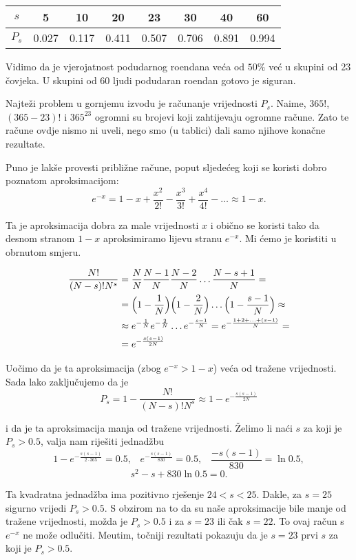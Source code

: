 \documentclass{ppclanak}
\begin{document}
\begin{enumerate}
\begin{center}
\begin{tabular}{|c|c|c|c|c|c|c|c|}
\hline $s$ & 5& 10 & 20 & 23 & 30 & 40 & 60\\
\hline $P_s$ & 0.027 & 0.117 & 0.411 & 0.507 & 0.706 & 0.891 &
0.994\\
\hline
\end{tabular}
\end{center}

Vidimo da je vjerojatnost podudarnog ro\dj endana ve\'{c}a od
$50\%$ ve\'{c} u skupini od 23 \v{c}ovjeka. U skupini od 60 ljudi
podudaran ro\dj endan gotovo je siguran.

Najte\v{z}i problem u gornjemu izvodu je ra\v{c}unanje vrijednosti
$P_s$. Naime, $365!$, $(365-23)!$ i $365^{23}$ ogromni su brojevi
koji zahtijevaju ogromne ra\v{c}une. Zato te ra\v{c}une ovdje
nismo ni uveli, nego smo (u tablici) dali samo njihove kona\v{c}ne
rezultate.

Puno je lak\v{s}e provesti pribli\v{z}ne ra\v{c}une, poput
sljede\'{c}eg koji se koristi dobro poznatom aproksimacijom:
\[e^{-x}=1-x +\frac{x^2}{2!}-\frac{x^3}{3!}+\frac{x^4}{4!}-\ldots \approx 1-x .\]

Ta je aproksimacija dobra za male vrijednosti $x$ i obi\v{c}no se
koristi tako da desnom stranom $1-x$ aproksimiramo lijevu stranu
$e^{-x}$. Mi \'{c}emo je koristiti u obrnutom smjeru.

\begin{equation*}
\begin{split}
\frac{N!}{(N-s)!N^s} &=\frac{N}{N}\frac{N-1}{N}\frac{N-2}{N}\ldots
\frac{N-s+1}{N}=\\
&=\Bigl(1-\frac{1}{N}\Bigr)\Bigl(1-\frac{2}{N}\Bigr)\ldots\Bigl(1-\frac{s-1}{N}\Bigr)\approx\\
& \approx e^{-\frac{1}{N}}e^{-\frac{2}{N}}\ldots
e^{-\frac{s-1}{N}}=e^{-\frac{1+2+\ldots +(s-1)}{N}}=\\
&= e^{-\frac{s(s-1)}{2N}}
\end{split}
\end{equation*}

Uo\v{c}imo da je ta aproksimacija (zbog $e^{-x}>1-x$) ve\'{c}a od
tra\v{z}ene vrijednosti. Sada lako zaklju\v{c}ujemo da je
\[P_s=1-\frac{N!}{(N-s)!N^s}\approx 1-e^{-\frac{s(s-1)}{2N}}\]

i da je ta aproksimacija manja od tra\v{z}ene vrijednosti.
\v{Z}elimo li na\'{c}i $s$ za koji je $P_s>0.5$, valja nam
rije\v{s}iti jednad\v{z}bu
\[1-e^{-\frac{s(s-1)}{2\cdot 365}}=0.5, \;\;\; e^{-\frac{s(s-1)}{830}}=0.5, \;\;\; \frac{-s(s-1)}{830}=\ln{0.5},\]
\[s^2 -s + 830 \ln{0.5}=0.\]

Ta kvadratna jednad\v{z}ba ima pozitivno rje\v{s}enje $24<s<25$.
Dakle, za $s=25$ sigurno vrijedi $P_s>0.5$. S obzirom na to da su
na\v{s}e aproksimacije bile manje od tra\v{z}ene vrijednosti,
mo\v{z}da je $P_s >0.5$ i za $s=23$ ili \v{c}ak $s=22$. To ovaj
ra\v{c}un s $e^{-x}$ ne mo\v{z}e odlu\v{c}iti. Me\dj utim,
to\v{c}niji rezultati pokazuju da je $s=23$ prvi $s$ za koji je
$P_s>0.5$.

\end{enumerate}



\newpage
{\scriptsize \listoffixmes }
\end{document}
